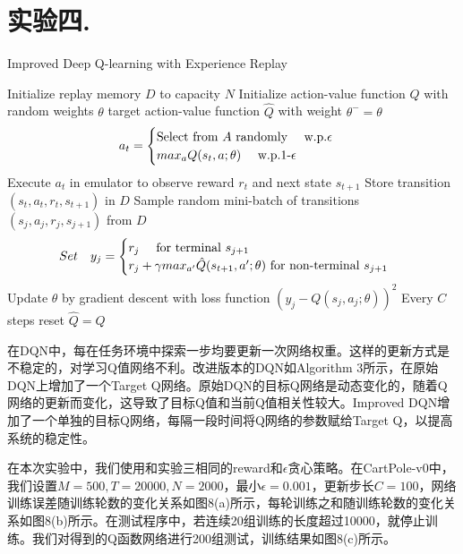 \documentclass[a4paper,UTF8]{article}
\theoremstyle{definition}
\renewcommand{\algorithmicrequire}{\textbf{Input:}}
\renewcommand{\algorithmicensure}{\textbf{Procedure:}}
\begin{document}
\section*{实验四. }
	\begin{algorithm}[!h]
	\renewcommand{\algorithmicrequire}{\textbf{Input:}}
	\renewcommand{\algorithmicensure}{\textbf{Output:}}
	\caption{Improved Deep Q-learning with Experience Replay}
	\label{alg:3}
	\begin{algorithmic}[1]
		\STATE Initialize replay memory $D$ to capacity $N$
		\STATE Initialize action-value function $Q$ with random weights $\theta$
		\STATE target action-value function $\hat{Q}$ with weight $\theta^-=\theta$
			\STATE	$$a_t=
\begin{cases}
\text{Select from $A$ randomly \quad w.p.$\epsilon$}\\
\text{$max_a$$Q(s_t,a;\theta)$ \quad w.p.1-$\epsilon$ }
\end{cases}$$
\STATE Execute $a_t$ in emulator to observe reward $r_t$ and next state $s_{t+1}$
\STATE Store transition $(s_t,a_t,r_t,s_{t+1})$ in $D$
\STATE Sample random mini-batch of transitions $(s_j,a_j,r_j,s_{j+1})$ from $D$
\STATE	$$Set \quad y_j=
\begin{cases}
\text{$r_j$ \quad for terminal $s_{j+1}$}\\
\text{$r_j+\gamma max_{a'}\hat{Q}(s_{t+1},a';\theta)$ for non-terminal $s_{j+1}$ }
\end{cases}$$
\STATE Update $\theta$ by gradient descent with loss function $(y_j-Q(s_j,a_j;\theta))^2$
\STATE Every $C$ steps reset $\hat{Q}=Q$
			\ENDFOR
		\ENDFOR
\end{algorithmic}  
\end{algorithm}

	在DQN中，每在任务环境中探索一步均要更新一次网络权重。这样的更新方式是不稳定的，对学习Q值网络不利。改进版本的DQN如Algorithm 3所示，在原始DQN上增加了一个Target Q网络。原始DQN的目标Q网络是动态变化的，随着Q网络的更新而变化，这导致了目标Q值和当前Q值相关性较大。Improved DQN增加了一个单独的目标Q网络，每隔一段时间将Q网络的参数赋给Target Q，以提高系统的稳定性。

	在本次实验中，我们使用和实验三相同的reward和$\epsilon$贪心策略。在CartPole-v0中，我们设置$M=500,T=20000,N=2000$，最小$\epsilon=0.001$，更新步长$C=100$，网络训练误差随训练轮数的变化关系如图8(a)所示，每轮训练之和随训练轮数的变化关系如图8(b)所示。在测试程序中，若连续20组训练的长度超过10000，就停止训练。我们对得到的Q函数网络进行200组测试，训练结果如图8(c)所示。
\end{document}
